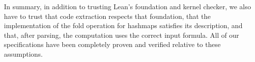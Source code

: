 In summary, in addition to trusting Lean's foundation and kernel checker,
we also have to trust that code extraction respects that foundation,
that the implementation of the fold operation for hashmaps satisfies its description,
and that, after parsing, the computation uses the correct input formula.
All of our specifications have been completely proven and verified relative to these assumptions.


